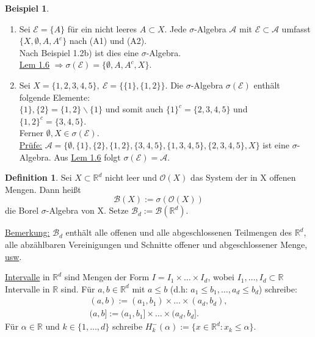 \documentclass[a4paper]{report}
\newcommand{\R}{\mathbb{R}}
\newcommand{\Borel}{\mathcal{B}}
\newcommand{\Bd}{\Borel_d}
\newcommand{\jlabel}[1]{\label{j_#1}}
\newcommand{\jhyperref}[2]{\hyperref[j_#1]{#2}}
\newcommand{\jlink}[1]{\jhyperref{#1}{#1}}
\theoremstyle{plain}
\theoremstyle{definition}
\newtheorem{defn}[thm]{Definition}
\newtheorem{expl}[thm]{Beispiel}
\begin{document}
\jlabel{Bsp 1.7}
\begin{expl}
    \begin{enumerate}
        \item 
            Sei $\mathcal{E} = \{A\}$ für ein nicht leeres $A \subset X$. Jede $\sigma$-Algebra $\mathcal{A}$ mit $\mathcal{E} \subset \mathcal{A}$ umfasst $\{X, \emptyset, A, A^c\}$ nach (A1) und (A2).\\
            Nach Beispiel 1.2b) ist dies eine $\sigma$-Algebra.\\
            \jlink{Lem 1.6} $\Rightarrow \sigma(\mathcal{E}) = \{\emptyset, A, A^c, X\}$.
        \item
            Sei $X = \{1,2,3,4,5\},\ \mathcal{E} = \{\{1\}, \{1,2\}\}$. Die $\sigma$-Algebra $\sigma(\mathcal{E})$ enthält folgende Elemente:\\
            $\{1\}, \{2\}= \{1,2\} \backslash \{1\}$ und somit auch $\{1\}^c = \{2,3,4,5\}$ und $\{1,2\}^c = \{3,4,5\}$.\\
            Ferner $\emptyset, X \in \sigma(\mathcal{E})$.\\
            \uline{Prüfe:} $\mathcal{A} = \{\emptyset, \{1\}, \{2\}, \{1,2\}, \{3,4,5\}, \{1,3,4,5\}, \{2,3,4,5\}, X\}$ ist eine $\sigma$-Algebra. Aus \jlink{Lem 1.6} folgt $\sigma(\mathcal{E})=\mathcal{A}$.
    \end{enumerate}
\end{expl}


\begin{defn}
\jlabel{Def 1.8}
    Sei $X \subset \R^d$ nicht leer und $\mathcal{O}(X)$ das System der in X offenen Mengen. Dann heißt 
    \begin{displaymath}
        \Borel(X) := \sigma(\mathcal{O}(X))
    \end{displaymath}
    die Borel $\sigma$-Algebra von X. Setze $\Bd := \Borel(\R^d)$.
    
    \vspace{12pt}
    
    \uline{Bemerkung:} $\Bd$ enthält alle offenen und alle abgeschlossenen Teilmengen des $\R^d$, alle abzählbaren Vereinigungen und Schnitte offener und abgeschlossener Menge, \uline{usw}.
\end{defn}
\uline{Intervalle} in $\R^d$ sind Mengen der Form $I = I_1 \times \dots \times I_d$, wobei $I_1, \dots, I_d \subset \R$ Intervalle in $\R$ sind. Für $a, b \in \R^d$ mit $a \le b$ (d.h: $a_1 \le b_1, \dots, a_d \le b_d$) schreibe:
\begin{displaymath}
    \begin{split}
        (a,b) := (a_1, b_1) \times \dots \times (a_d, b_d),\\
        (a,b] := (a_1, b_1] \times \dots \times (a_d, b_d].
    \end{split}
\end{displaymath}
Für $\alpha \in \R$ und $k \in \{1,\dots,d\}$ schreibe $H_k^-(\alpha) := \{x \in \R^d: x_k \le \alpha\}$.
\end{document}
